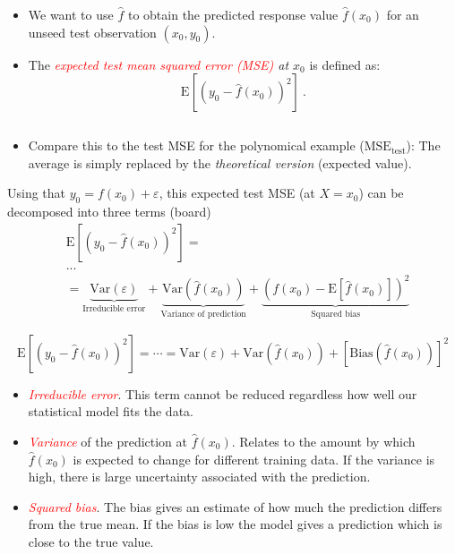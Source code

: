\documentclass[ignorenonframetext,]{beamer}
\providecommand{\tightlist}{%
  \setlength{\itemsep}{0pt}\setlength{\parskip}{0pt}}
\begin{document}
\begin{frame}

\begin{itemize}
\item
  We want to use \(\hat{f}\) to obtain the predicted response value
  \(\hat{f}(x_0)\) for an unseed test observation \((x_0,y_0)\).
\item
  The \emph{\textcolor{red}{expected test mean squared error (MSE)} at
  \(x_0\)} is defined as: \[\text{E}[(y_0 - \hat{f}(x_0))^2] \ .\]
\end{itemize}

\(~\)

\begin{itemize}
\tightlist
\item
  Compare this to the test MSE for the polynomical example
  (\(\text{MSE}_{\text{test}}\)): The average is simply replaced by the
  \emph{theoretical version} (expected value).
\end{itemize}

\end{frame}

\begin{frame}

Using that \(y_0=f(x_0)+\varepsilon\), this expected test MSE (at
\(X=x_0\)) can be decomposed into three terms (board) \begin{align*}
&\text{E}[(y_0 - \hat{f}(x_0))^2] = \\
& ... \\
& =  \underbrace{\text{Var}(\varepsilon)}_{\text{Irreducible error}} + \underbrace{\text{Var}(\hat{f}(x_0))}_{\text{Variance of prediction}} + \underbrace{\left( f(x_0) - \text{E}[\hat{f}(x_0)] \right)^2}_{\text{Squared bias}}
\end{align*}

\end{frame}

\begin{frame}

\[\text{E}[(y_0 - \hat{f}(x_0))^2]=\cdots=\text{Var}(\varepsilon) +  \text{Var}(\hat{f}(x_0))+[\text{Bias}(\hat{f}(x_0))]^2\]

\begin{itemize}
\item
  \emph{\textcolor{red}{Irreducible error}}. This term cannot be reduced
  regardless how well our statistical model fits the data.
\item
  \emph{\textcolor{red}{Variance}} of the prediction at
  \(\hat{f}(x_0)\). Relates to the amount by which \(\hat{f}(x_0)\) is
  expected to change for different training data. If the variance is
  high, there is large uncertainty associated with the prediction.
\item
  \emph{\textcolor{red}{Squared bias}}. The bias gives an estimate of
  how much the prediction differs from the true mean. If the bias is low
  the model gives a prediction which is close to the true value.
\end{itemize}

\end{frame}
\end{document}
